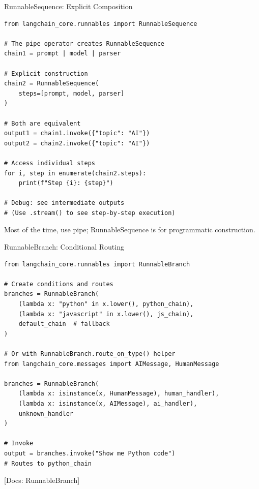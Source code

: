 \documentclass[aspectratio=169,11pt]{beamer}
\newcommand{\docref}[1]{{\scriptsize\color{docgray}[Docs: #1]}}
\begin{document}
\begin{frame}[fragile]{RunnableSequence: Explicit Composition}
  \begin{codebox}
\begin{lstlisting}
from langchain_core.runnables import RunnableSequence

# The pipe operator creates RunnableSequence
chain1 = prompt | model | parser

# Explicit construction
chain2 = RunnableSequence(
    steps=[prompt, model, parser]
)

# Both are equivalent
output1 = chain1.invoke({"topic": "AI"})
output2 = chain2.invoke({"topic": "AI"})

# Access individual steps
for i, step in enumerate(chain2.steps):
    print(f"Step {i}: {step}")

# Debug: see intermediate outputs
# (Use .stream() to see step-by-step execution)
\end{lstlisting}
  \end{codebox}

  \small Most of the time, use pipe; RunnableSequence is for programmatic construction.
\end{frame}


\begin{frame}[fragile]{RunnableBranch: Conditional Routing}
  \begin{codebox}
\begin{lstlisting}
from langchain_core.runnables import RunnableBranch

# Create conditions and routes
branches = RunnableBranch(
    (lambda x: "python" in x.lower(), python_chain),
    (lambda x: "javascript" in x.lower(), js_chain),
    default_chain  # fallback
)

# Or with RunnableBranch.route_on_type() helper
from langchain_core.messages import AIMessage, HumanMessage

branches = RunnableBranch(
    (lambda x: isinstance(x, HumanMessage), human_handler),
    (lambda x: isinstance(x, AIMessage), ai_handler),
    unknown_handler
)

# Invoke
output = branches.invoke("Show me Python code")
# Routes to python_chain
\end{lstlisting}
  \end{codebox}

  \docref{RunnableBranch}
\end{frame}
\end{document}
